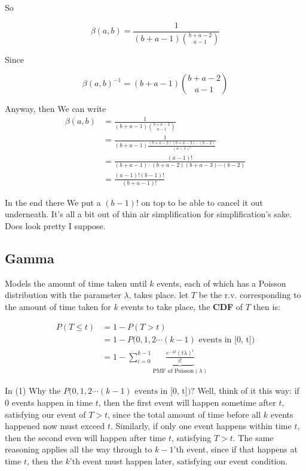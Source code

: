 \documentclass{article}
\begin{document}
		So
		
		\[ \beta(a, b) = \frac{1}{(b+a-1){b+a-2\choose a-1}} \]		
		
		Since
		
		\[ \beta(a, b)^{-1} = (b+a-1){b+a-2\choose a-1} \]		
		
		Anyway, then We can write
		\begin{align*}
		\beta(a, b) &= \frac{1}{(b+a-1){b+a-2\choose a-1}}\\
		&=\frac{1}{(b+a-1)\frac{(b+a-2)(b+a-3)\cdots (b-2)}{(a-1)!}}\\
		&=\frac{(a-1)!}{(b+a-1)\cdot (b+a-2)(b+a-3)\cdots (b-2)}\\
		&=\frac{(a-1)!(b-1)!}{(b+a-1)!}
		\end{align*}		
		
		In the end there We put a $(b-1)!$ on top to be able to cancel it out underneath. It's all a bit out of thin air simplification for simplification's sake. Does look pretty I suppose.
		
		
	\subsection{Gamma}
	
		Models the amount of time taken until $k$ events, each of which has a Poisson distribution with the parameter $\lambda$, takes place. let $T$ be the r.v. corresponding to the amount of time taken for $k$ events to take place, the \textbf{CDF} of $T$ then is: 
		
		\begin{align}
		P(T\le t) &= 1-P(T>t) \\
		&= 1-P(0, 1, 2\cdots (k-1) \text{ events in [0, t])}\\
		&= 1-\sum^{k-1}_{i=0} \underbrace{\frac{e^{-\lambda t}(t \lambda)^{i}}{i!}}_{\text{PMF of Poisson}(\lambda)}
		\end{align}
		
		In (1) Why the $P(0, 1, 2\cdots (k-1) \text{ events in [0, t])}$? Well, think of it this way: if 0 events happen in time $t$, then the first event will happen sometime after $t$, satisfying our event of $T>t$, since the total amount of time before all $k$ events happened now must exceed $t$. Similarly, if only one event happens within time $t$, then the second even will happen after time $t$, satisfying $T>t$. The same reasoning applies all the way through to $k-1$'th event, since if that happens at time $t$, then the $k$'th event must happen later, satisfying our event condition.	
		
\end{document}
